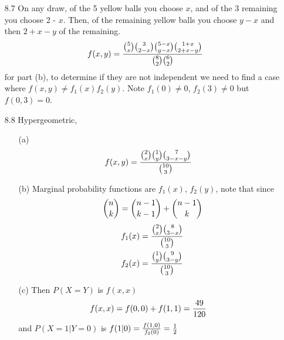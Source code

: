 \documentclass[english, 11pt]{article}
\begin{document}
\begin{itemize}
    \item[8.7] On any draw, of the 5 yellow balls you choose $x$, and of the 3 remaining you choose 2 - $x$. Then, of the remaining yellow balls you choose $y-x$ and then $2 + x - y$ of the remaining.
    \[ f(x,y) = \frac{{5 \choose x}{3 \choose 2-x}{5-x \choose y-x}{1+x \choose 2+x-y}}{{8 \choose 2}{6 \choose 2}} \]
    for part (b), to determine if they are not independent we need to find a case where $f(x,y) \not = f_1(x)f_2(y)$. Note $f_1(0) \not = 0$, $f_2(3) \not = 0$ but $f(0,3) = 0$.

    \item[8.8] Hypergeometric,
    \begin{itemize}
      \item[(a)] \begin{align*}
      f(x,y) & = \frac{{2 \choose x}{1 \choose y}{7 \choose 3-x-y}}{{10 \choose 3}}
    \end{align*}
    \item[(b)] Marginal probability functions are $f_1(x)$, $f_2(y)$, note that since
    \[ {n \choose k} = {n-1 \choose k-1} + {n-1 \choose k} \]
    \begin{align*}
      f_1(x) & = \frac{{2 \choose x}{8 \choose 3-x}}{{10 \choose 3}} \\
      f_2(x) & = \frac{{1 \choose y} {9 \choose 3-y}}{{10 \choose 3}}
    \end{align*}

    \item[(c)] Then $P(X = Y)$ is $f(x,x)$
    \begin{align*}
      f(x,x) & = f(0,0) + f(1,1) = \frac{49}{120}
    \end{align*}
    and $P(X = 1 | Y = 0)$ is $f(1|0) = \frac{f(1,0)}{f_2(0)} = \frac{1}{2}$
    \end{itemize}



\end{itemize}
\end{document}
